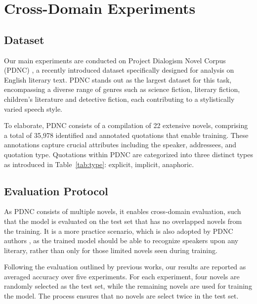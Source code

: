 \documentclass[letterpaper]{article} %
\begin{document}
\section{Cross-Domain Experiments}
\label{sec:experiments}

\subsection{Dataset}
\label{ssec: dataset}
Our main experiments are conducted on Project Dialogism Novel Corpus (PDNC) \citep{DBLP:conf/lrec/VishnubhotlaHH22}, a recently introduced dataset specifically designed for analysis on English literary text. PDNC stands out as the largest dataset for this task, encompassing a diverse range of genres such as science fiction, literary fiction, children's literature and detective fiction, each contributing to a stylistically varied speech style.

To elaborate, PDNC consists of a compilation of 22 extensive novels, comprising a total of 35,978 identified and annotated quotations that enable training. These annotations capture crucial attributes including the speaker, addressees, and quotation type. Quotations within PDNC are categorized into three distinct types as introduced in Table~\ref{tab:type}: explicit, implicit, anaphoric.


\subsection{Evaluation Protocol}
\label{ssec:protocol}

As PDNC consists of multiple novels, it enables cross-domain evaluation, such that the model is evaluated on the test set that has no overlapped novels from the training. It is a more practice scenario, which is also adopted by PDNC authors \cite{DBLP:conf/lrec/VishnubhotlaHH22,DBLP:conf/acl/VishnubhotlaRHH23}, as the trained model should be able to recognize speakers upon any literary, rather than only for those limited novels seen during training.

Following the evaluation outlined by previous works, our results are reported as averaged accuracy over five experiments. For each experiment, four novels are randomly selected as the test set, while the remaining novels are used for training the model. The process ensures that no novels are select twice in the test set.
\end{document}
